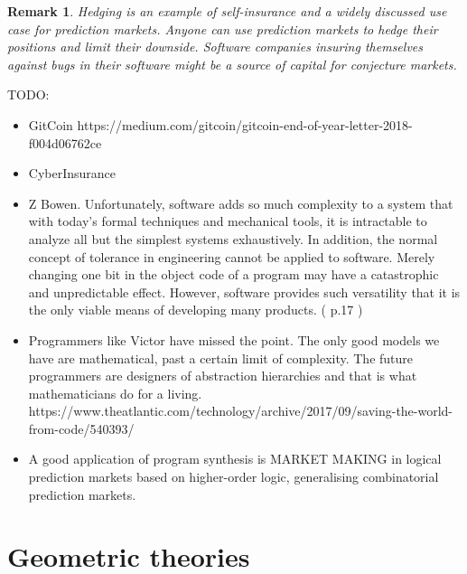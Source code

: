 \documentclass[english,letter paper,12pt,reqno]{article}
\theoremstyle{example}
\newtheorem{example}[theorem]{Example}
\newtheorem{remark}[theorem]{Remark}
\begin{document}

\begin{remark} Hedging is an example of self-insurance and a widely discussed use case for prediction markets. Anyone can use prediction markets to hedge their positions and limit their downside. Software companies insuring themselves against bugs in their software might be a source of capital for conjecture markets.
\end{remark}

TODO:
\begin{itemize}
\item GitCoin https://medium.com/gitcoin/gitcoin-end-of-year-letter-2018-f004d06762ce
\item CyberInsurance
\item Z Bowen. Unfortunately, software adds so much complexity to a system that with today's formal techniques and mechanical tools, it is intractable to analyze all but the simplest systems exhaustively. In addition, the normal concept of tolerance in engineering cannot be applied to software. Merely changing one bit in the object code of a program may have a catastrophic and unpredictable effect. However, software provides such versatility that it is the only viable means of developing many products. ( p.17 )
\item Programmers like Victor have missed the point. The only good models we have are mathematical, past a certain limit of complexity. The future programmers are designers of abstraction hierarchies and that is what mathematicians do for a living. https://www.theatlantic.com/technology/archive/2017/09/saving-the-world-from-code/540393/
\item A good application of program synthesis is MARKET MAKING in logical prediction markets based on higher-order logic, generalising combinatorial prediction markets.
\end{itemize}

\appendix

\section{Geometric theories}\label{section:geometric}
\end{document}
